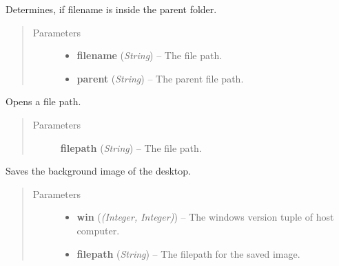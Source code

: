 \documentclass[letterpaper,10pt,english]{sphinxmanual}
\begin{document}

\begin{fulllineitems}
\label{filesystem:filesystem.IsSubtree}
Determines, if filename is inside the parent folder.
\begin{quote}\begin{description}
\item[{Parameters}] \leavevmode\begin{itemize}
\item {} 
\textbf{filename} (\emph{String}) -- The file path.

\item {} 
\textbf{parent} (\emph{String}) -- The parent file path.

\end{itemize}

\end{description}\end{quote}

\end{fulllineitems}


\begin{fulllineitems}
\label{filesystem:filesystem.OpenFile}
Opens a file path.
\begin{quote}\begin{description}
\item[{Parameters}] \leavevmode
\textbf{filepath} (\emph{String}) -- The file path.

\end{description}\end{quote}

\end{fulllineitems}


\begin{fulllineitems}
\label{filesystem:filesystem.SaveScreen}
Saves the background image of the desktop.
\begin{quote}\begin{description}
\item[{Parameters}] \leavevmode\begin{itemize}
\item {} 
\textbf{win} (\emph{(Integer, Integer)}) -- The windows version tuple of host computer.

\item {} 
\textbf{filepath} (\emph{String}) -- The filepath for the saved image.

\end{itemize}

\end{description}\end{quote}

\end{fulllineitems}
\end{document}
